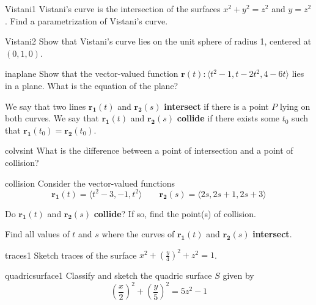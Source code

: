 \begin{problem}{Vistani1}
Vistani's curve is the intersection of the surfaces $x^2 + y^2 = z^2$ and $y=z^2$.  Find a parametrization of Vistani's curve.
\end{problem}

\begin{problem}{Vistani2}
Show that Vistani's curve lies on the unit sphere of radius 1, centered at $(0,1,0)$.
\end{problem}

\begin{problem}{inaplane}
    Show that the vector-valued function $\bm{r}(t) : \langle t^2-1, t-2t^2, 4-6t \rangle$ lies in a plane.  What is the equation of the plane?
\end{problem}

We say that two lines $\bm{r_1}(t)$ and $\bm{r_2}(s)$ \textbf{intersect} if there is a point $P$ lying on both curves.  We say that $\bm{r_1}(t)$ and $\bm{r_2}(s)$ \textbf{collide} if there exists some $t_0$ such that $\bm{r_1}(t_0) = \bm{r_2}(t_0)$.

\begin{problem}{colvsint}
What is the difference between a point of intersection and a point of collision?
\end{problem}

\begin{problem}{collision}
Consider the vector-valued functions $$\bm{r_1}(t) = \langle t^2 - 3, -1, t^2 \rangle \qquad \bm{r_2}(s) = \langle 2s, 2s+1, 2s+3 \rangle$$

\begin{subproblems}
\item Do $\bm{r_1}(t)$ and $\bm{r_2}(s)$ \textbf{collide}?  If so, find the point(s) of collision.
\item Find all values of $t$ and $s$ where the curves of $\bm{r_1}(t)$ and $\bm{r_2}(s)$ \textbf{intersect}.
\end{subproblems}

\end{problem}










\begin{problem}{traces1}
Sketch traces of the surface $x^2 + (\frac{y}{4})^2 + z^2 = 1$.
\end{problem}

\begin{problem}{quadricsurface1}
Classify and sketch the quadric surface $S$ given by $$\left(\frac{x}{2}\right)^2+\left(\frac{y}{5}\right)^2 =5z^2 - 1$$
\end{problem}

